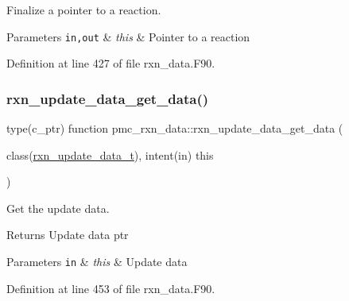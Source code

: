 Finalize a pointer to a reaction. 


\begin{DoxyParams}[1]{Parameters}
\mbox{\tt in,out}  & {\em this} & Pointer to a reaction \\
\hline
\end{DoxyParams}


Definition at line 427 of file rxn\+\_\+data.\+F90.

\mbox{\label{namespacepmc__rxn__data_a5eb5b555b9ce82e70a70568f33e97b46}} 
\subsubsection{\texorpdfstring{rxn\+\_\+update\+\_\+data\+\_\+get\+\_\+data()}{rxn\_update\_data\_get\_data()}}
{\footnotesize\ttfamily type(c\+\_\+ptr) function pmc\+\_\+rxn\+\_\+data\+::rxn\+\_\+update\+\_\+data\+\_\+get\+\_\+data (\begin{DoxyParamCaption}\item[{class(\mbox{\hyperlink{structpmc__rxn__data_1_1rxn__update__data__t}{rxn\+\_\+update\+\_\+data\+\_\+t}}), intent(in)}]{this }\end{DoxyParamCaption})\hspace{0.3cm}{\ttfamily [private]}}



Get the update data. 

\begin{DoxyReturn}{Returns}
Update data ptr
\end{DoxyReturn}

\begin{DoxyParams}[1]{Parameters}
\mbox{\tt in}  & {\em this} & Update data \\
\hline
\end{DoxyParams}


Definition at line 453 of file rxn\+\_\+data.\+F90.

\mbox{\label{namespacepmc__rxn__data_af7376f50bad1c8b21e68568ed7dfdf81}} 
